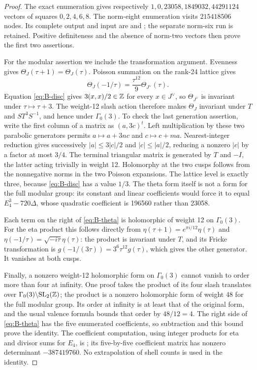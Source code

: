 \begin{proof}
The exact enumeration gives respectively
\(1,0,23058,1849032,44291124\) vectors of squares \(0,2,4,6,8\).
The norm-eight enumeration visits \(215418506\) nodes. Its complete
output and input are  and
; the separate norm-six run is retained.
Positive definiteness and the absence of norm-two vectors then prove
the first two assertions.

For the modular assertion we include the transformation argument.
Evenness gives \(\Theta_J(\tau+1)=\Theta_J(\tau)\). Poisson summation
on the rank-24 lattice gives
\[
 \Theta_J(-1/\tau)=\frac{\tau^{12}}9\Theta_{J^\vee}(\tau).
\]
Equation \eqref{eq:B-disc} gives \(3(x,x)/2\in\mathbb Z\) for every
\(x\in J^\vee\), so \(\Theta_{J^\vee}\) is invariant under
\(\tau\mapsto\tau+3\). The weight-12 slash action therefore makes
\(\Theta_J\) invariant under \(T\) and \(ST^3S^{-1}\), and hence
under \(\Gamma_0(3)\). To check the last generation assertion, write
the first column of a matrix as \((a,3c)^t\). Left multiplication by
these two parabolic generators permits \(a\mapsto a+3nc\) and
\(c\mapsto c+ma\). Nearest-integer reduction gives successively
\(|a|\le3|c|/2\) and \(|c|\le|a|/2\), reducing a nonzero
\(|c|\) by a factor at most \(3/4\). The terminal triangular matrix
is generated by \(T\) and \(-I\), the latter acting trivially in
weight 12. Holomorphy at the two cusps follows from the nonnegative
norms in the two Poisson expansions. The lattice level is exactly three, because \eqref{eq:B-disc} has
a value \(1/3\). The theta form itself is not a form for the full
modular group: its constant and linear coefficients would force
it to equal \(E_4^3-720\Delta\), whose quadratic coefficient is
196560 rather than 23058.

Each term on the right of \eqref{eq:B-theta} is holomorphic of weight
12 on \(\Gamma_0(3)\). For the eta product this follows directly from
\(\eta(\tau+1)=e^{\pi i/12}\eta(\tau)\) and
\(\eta(-1/\tau)=\sqrt{-i\tau}\eta(\tau)\): the product is invariant
under \(T\), and its Fricke transformation is
\(g(-1/(3\tau))=3^6\tau^{12}g(\tau)\), which gives the other
generator. It vanishes at both cusps.

Finally, a nonzero weight-12 holomorphic form on \(\Gamma_0(3)\)
cannot vanish to order more than four at infinity. One proof takes
the product of its four slash translates over
\(\Gamma_0(3)\backslash\mathrm{SL}_2(\mathbb Z)\); the product is a nonzero
holomorphic form of weight 48 for the full modular group. Its order
at infinity is at least that of the original form, and the usual
valence formula bounds that order by \(48/12=4\). The right side of
\eqref{eq:B-theta} has the five enumerated coefficients, so subtraction
and this bound prove the identity. The coefficient computation, using
integer products for eta and divisor sums for \(E_4\), is
; its five-by-five coefficient matrix has
nonzero determinant \(-387419760\). No extrapolation of shell counts
is used in the identity.
\end{proof}

